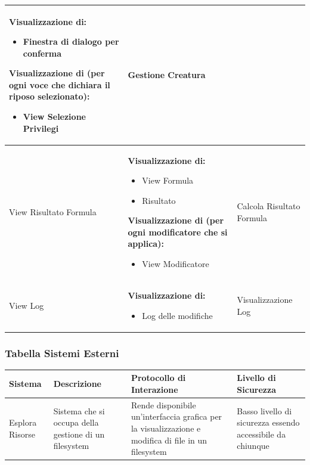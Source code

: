 \documentclass[a4paper, 11pt]{article}
\let\newline\\
\begin{document}
\begin{adjustwidth}{-1.5cm}{-1.5cm}
\begin{center}
\begin{longtable}{|p{5cm}|p{5cm}|p{5cm}|}
        \textbf{Visualizzazione di:}
        \begin{itemize}
            \item Finestra di dialogo per conferma
        \end{itemize} 
        
        \textbf{Visualizzazione di (per ogni voce che dichiara il riposo selezionato):}
        \begin{itemize}
            \item View Selezione Privilegi
        \end{itemize} & Gestione Creatura \\ \hline
        
        View Risultato Formula &
        \textbf{Visualizzazione di:}
        \begin{itemize}
            \item View Formula
            \item Risultato
        \end{itemize}
        \textbf{Visualizzazione di (per ogni modificatore che si applica):}
        \begin{itemize}
            \item View Modificatore 
        \end{itemize} & Calcola Risultato Formula\\ \hline
        
        View Log & 
        \textbf{Visualizzazione di:}
        \begin{itemize}
            \item Log delle modifiche
        \end{itemize} & Visualizzazione Log \\ \hline

        \end{longtable}
    \end{center}
\end{adjustwidth}

\subsubsection*{Tabella Sistemi Esterni}
\begin{adjustwidth}{-1.5cm}{-1.5cm}
\begin{center}
    \begin{tabular}{|p{2.5cm}|p{5cm}|p{4cm}|p{4cm}|}
        \hline
        \textbf{Sistema} & \textbf{Descrizione} & \textbf{Protocollo di \newline Interazione} & \textbf{Livello di Sicurezza} \\ \hline
        Esplora Risorse & Sistema che si occupa della gestione di un filesystem & Rende disponibile un’interfaccia grafica per la visualizzazione e modifica di file in un filesystem & Basso livello di sicurezza essendo accessibile da chiunque \\ \hline
    \end{tabular}
\end{center}
\end{adjustwidth}
\end{document}
